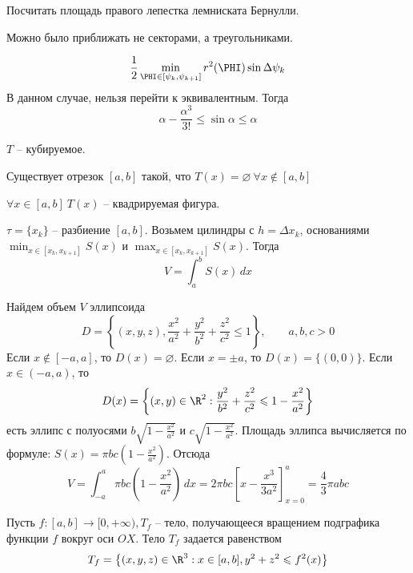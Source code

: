\begin{Ex}
	Посчитать площадь правого лепестка лемниската Бернулли.
\end{Ex}

\begin{Rem}
	Можно было приближать не секторами, а треугольниками. 
	
	\begin{figure}[H]
		\centering
		\def\svgwidth{.35\columnwidth}
		
	\end{figure}

	\[\frac{1}{2} \min_{\PHI \in [\psi_k, \psi_{k + 1}]} r^2(\PHI) \sin \Delta \psi_k\]
	В данном случае, нельзя перейти к эквивалентным. Тогда
	\[\alpha - \frac{\alpha^3}{3!} \leqslant \sin \alpha \leqslant \alpha\]
\end{Rem}


$T$ -- кубируемое.

\begin{MyItemize}
	\item Существует отрезок $[a, b]$ такой, что $T(x) = \varnothing \ \forall x \notin [a, b]$
	\item $\forall x \in [a, b] \ T(x)$ -- квадрируемая фигура.  
\end{MyItemize}

$\tau = \{x_k\}$ -- разбиение $[a, b]$. Возьмем цилиндры с $h = \Delta x_k$, основаниями $\displaystyle \min_{x \in [x_k, x_{k + 1}]} S(x)$ и $\displaystyle \max_{x \in [x_k, x_{k + 1}]} S(x)$. Тогда
\[V = \int_a^b S(x) \,dx\]

\begin{Example}
	Найдем объем $V$ эллипсоида
	\[D = \left\{(x, y, z), \frac{x^2}{a^2} + \frac{y^2}{b^2} + \frac{z^2}{c^2} \leqslant 1\right\}, \qquad a, b, c > 0\]
	Если $x \notin [-a, a]$, то $D(x) = \varnothing$. Если $x = \pm a$, то $D(x) = \{(0, 0)\}$.
	Если $x \in (-a, a)$, то
	\[D(x) = \left\{(x, y) \in \R^2 : \frac{y^2}{b^2} + \frac{z^2}{c^2} \leqslant 1 - \frac{x^2}{a^2}\right\}\] 
	есть эллипс с полуосями $b\sqrt{1 - \frac{x^2}{a^2}}$ и $c\sqrt{1 - \frac{x^2}{a^2}}$.
	Площадь эллипса вычисляется по формуле: $S(x) = \pi bc \left(1 - \frac{x^2}{a^2}\right)$. Отсюда
	\[V = \int_{-a}^a \pi bc \left(1 - \frac{x^2}{a^2}\right)\,dx = 2\pi bc \left[x - \frac{x^3}{3a^2}\right]_{x = 0}^a = \frac{4}{3} \pi abc\] 
\end{Example}

\begin{Rem}
	Пусть $f : [a, b] \to [0, +\infty), T_f$ -- тело, получающееся вращением подграфика функции $f$ вокруг оси $OX$.
	Тело $T_f$ задается равенством
	\[T_f = \left\{(x, y, z) \in \R^3 : x \in [a, b], y^2 + z^2 \leqslant f^2(x)\right\}\] 
\end{Rem}

